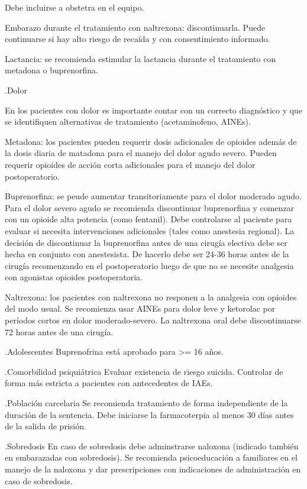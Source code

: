 Debe incluirse a obstetra en el equipo.

Embarazo durante el tratamiento con naltrexona: discontinuarla. Puede continuarse si hay alto riesgo de recaída y con consentimiento informado.

Lactancia: se recomienda estimular la lactancia durante el tratamiento con metadona o buprenorfina.

.Dolor

En los pacientes con dolor es importante contar con un correcto diagnóstico y que se identifiquen alternativas de tratamiento (acetaminofeno, AINEs).

Metadona: los pacientes pueden requerir dosis adicionales de opioides además de la dosis diaria de matadona para el manejo del dolor agudo severo. Pueden requerir opioides de acción corta adicionales para el manejo del dolor postoperatorio.

Buprenorfina: se peude aumentar transitoriamente para el dolor moderado agudo. Para el dolor severo agudo se recomienda discontinuar buprenorfina y comenzar con un opioide alta potencia (como fentanil). Debe controlarse al paciente para evaluar si necesita intervenciones adicionales (tales como anestesia regional).
La decisión de discontinuar la buprenorfina antes de una cirugía electiva debe ser hecha en conjunto con anestesista. De hacerlo debe ser 24-36 horas antes de la cirugía recomenzando en el postoperatorio luego de que no se necesite analgesia con agonistas opioides postoperatoria.

Naltrexona: los pacientes con naltrexona no responen a la analgesia con opioides del modo usual. Se recomienza usar AINEs para dolor leve y ketorolac por períodos cortos en dolor moderado-severo.
La naltrexona oral debe discontinuarse 72 horas antes de una cirugía.

.Adolescentes
Buprenofrina está aprobado para >= 16 años.

.Comorbilidad psiquiátrica
Evaluar existencia de riesgo suicida.
Controlar de forma más estricta a pacientes con antecedentes de IAEs.

.Población carcelaria
Se recomienda tratamiento de forma independiente de la duración de la sentencia.
Debe iniciarse la farmacoterpia al menos 30 días antes de la salida de prisión.

.Sobredosis
En caso de sobredosis debe adminstrarse naloxona (indicado también en embarazadas con sobredosis).
Se recomienda psicoeducación a familiares en el manejo de la naloxona y dar prescripciones con indicaciones de administración en caso de sobredosis.

